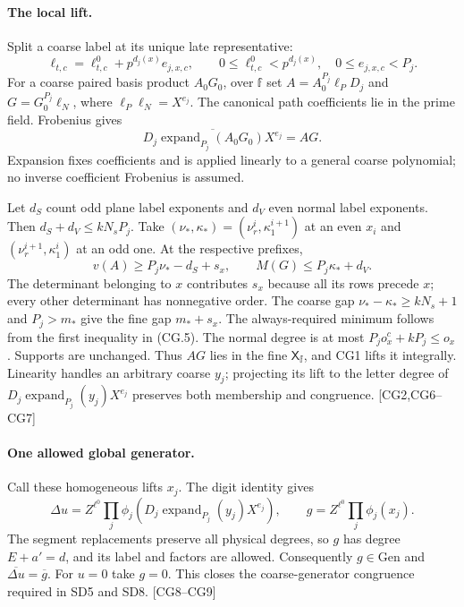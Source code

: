 \documentclass[11pt,a4paper]{article}
\numberwithin{equation}{section}
\theoremstyle{remark}\newtheorem{remark}[theorem]{Remark}
\begin{document}
\paragraph{The local lift.}
Split a coarse label at its unique late representative:
\[
 \ell_{t,c}=\ell^0_{t,c}+p^{d_j(x)}e_{j,x,c},\qquad
 0\le\ell^0_{t,c}<p^{d_j(x)},\quad0\le e_{j,x,c}<P_j. \tag{CG.6}
\]
For a coarse paired basis product $A_0G_0$, over $\mathbb f$ set
$A=A_0^{P_j}\ell_P D_j$ and $G=G_0^{P_j}\ell_N$, where
$\ell_P\ell_N=X^{e_j}$.
The canonical path coefficients lie in the prime field. Frobenius gives
\[
 \overline{D_j\operatorname{expand}_{P_j}(A_0G_0)X^{e_j}}=AG.
\]
Expansion fixes coefficients and is applied linearly to a general
coarse polynomial; no inverse coefficient Frobenius is assumed.

Let $d_S$ count odd plane label exponents and $d_V$ even normal label
exponents. Then $d_S+d_V\le kN_sP_j$. Take
$(\nu_*,\kappa_*)=(\nu^i_r,\kappa^{i+1}_1)$ at an even $x_i$ and
$(\nu^{i+1}_r,\kappa^i_1)$ at an odd one. At the respective prefixes,
\[
 v(A)\ge P_j\nu_*-d_S+s_x,\qquad
 M(G)\le P_j\kappa_*+d_V.                            \tag{CG.7}
\]
The determinant belonging to $x$ contributes $s_x$ because all its
rows precede $x$; every other determinant has nonnegative order.
The coarse gap $\nu_*-\kappa_*\ge kN_s+1$ and $P_j>m_*$
give the fine gap $m_*+s_x$. The always-required minimum follows from
the first inequality in (CG.5). The normal degree is at most
$P_jo^c_x+kP_j\le o_x$. Supports are unchanged. Thus $AG$ lies in the
fine $\mathsf X_{\mathbb f}$, and CG1 lifts it integrally.
Linearity handles an arbitrary coarse $y_j$; projecting its lift to
the letter degree of $D_j\operatorname{expand}_{P_j}(y_j)X^{e_j}$
preserves both membership and congruence. \textsf{[CG2,CG6--CG7]}

\paragraph{One allowed global generator.}
Call these homogeneous lifts $x_j$. The digit identity gives
\[
 \Delta u=Z^{\ell^0}\prod_j\phi_j
       (D_j\operatorname{expand}_{P_j}(y_j)X^{e_j}),
 \qquad g=Z^{\ell^0}\prod_j\phi_j(x_j).               \tag{CG.8}
\]
The segment replacements preserve all physical degrees, so $g$ has
degree $E+a'=d$, and its label and factors are allowed. Consequently
$g\in\mathrm{Gen}$ and $\overline{\Delta u}=\overline g$.
For $u=0$ take $g=0$. This closes the coarse-generator congruence
required in SD5 and SD8. \textsf{[CG8--CG9]}
\end{document}
